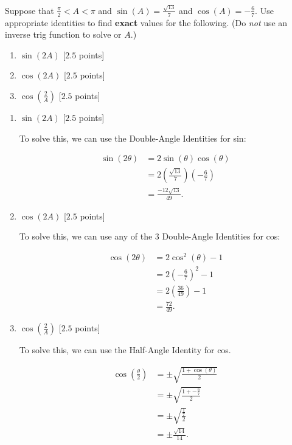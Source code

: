 \newpage

\begin{problem}
  Suppose that $\frac{\pi}{2} < A < \pi$ and $\sin (A) = \frac{\sqrt{13}}{7}$
  and $\cos (A) = -\frac{6}{7}$. Use appropriate identities to find
  \textbf{exact} values for the following. (Do \textit{not} use an inverse
  trig function to solve or $A$.)

  \begin{enumerate}
    \item $\sin (2A)$ [$2.5$ points]
    \item $\cos (2A)$ [$2.5$ points]
    \item $\cos (\frac{2}{A})$ [$2.5$ points]
  \end{enumerate}
\end{problem}

\begin{solution}
  \begin{enumerate}
    \item $\sin (2A)$ [$2.5$ points]

      To solve this, we can use the Double-Angle Identities for sin:

      \begin{align*}
        \sin (2\theta) &= 2\sin(\theta)\cos(\theta) \\
                       &= 2 \left(\frac{\sqrt{13}}{7}\right) \left(-\frac{6}{7}\right) \\
                       &= \frac{-12\sqrt{13}}{49}
      .\end{align*}

    \item $\cos (2A)$ [$2.5$ points]

      To solve this, we can use any of the $3$ Double-Angle Identities for cos:

      \begin{align*}
        \cos (2\theta) &= 2\cos^{2} (\theta) - 1 \\
                       &= 2\left(-\frac{6}{7}\right)^{2} - 1 \\
                       &= 2\left(\frac{36}{49}\right) - 1 \\
                       &= \frac{72}{49}
      .\end{align*}

    \item $\cos (\frac{2}{A})$ [$2.5$ points]

      To solve this, we can use the Half-Angle Identity for cos.

      \begin{align*}
        \cos (\frac{\theta}{2}) &= \pm \sqrt{\frac{1 + \cos (\theta)}{2}} \\
                                &= \pm\sqrt{\frac{1 + -\frac{6}{7}}{2}} \\
                                &= \pm\sqrt{\frac{\frac{1}{7}}{2}} \\
                                &= \pm\frac{\sqrt{14}}{14}
      .\end{align*}
  \end{enumerate}
\end{solution}
